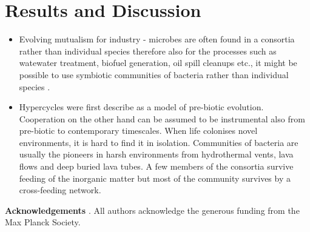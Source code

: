 \section{Results and Discussion}

\begin{itemize}
	\item Evolving mutualism for industry - microbes are often found in a consortia rather than individual species therefore also for the processes such as watewater treatment, biofuel generation, oil spill cleanups etc., it might be possible to use symbiotic communities of bacteria rather than individual species \citep{zuroff:AppMB:2012}.
	\item Hypercycles were first describe as a model of pre-biotic evolution. Cooperation on the other hand can be assumed to be instrumental also from pre-biotic to contemporary timescales. When life colonises novel environments, it is hard to find it in isolation. Communities of bacteria are usually the pioneers in harsh environments from hydrothermal vents, lava flows and deep buried lava tubes. A few members of the consortia survive feeding of the inorganic matter but most of the community survives by a cross-feeding network.
\end{itemize}

\textbf{Acknowledgements} . All authors acknowledge the generous funding from the Max Planck Society.

